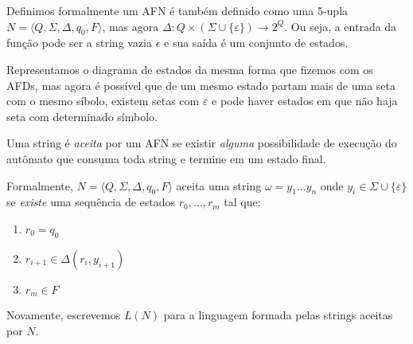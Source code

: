 Definimos formalmente um AFN é também definido como uma 5-upla $N = \langle Q, \Sigma, \Delta, q_0, F \rangle$, mas agora $\Delta: Q \times (\Sigma \cup \{\varepsilon\}) \to 2^Q$.
Ou seja, a entrada da função pode ser a string vazia $\epsilon$ e sua saída é um conjunto de estados.

Representamos o diagrama de estados da mesma forma que fizemos com os AFDs, mas agora é possível que de um mesmo estado partam mais de uma seta com o mesmo síbolo, existem setas com $\varepsilon$ e pode haver estados em que não haja seta com determinado símbolo.

Uma string é {\em aceita} por um AFN se existir {\em alguma} possibilidade de execução do autômato que consuma toda string e termine em um estado final.

Formalmente, $N = \langle Q, \Sigma, \Delta, q_0, F \rangle$ aceita uma string $\omega = y_1 \dots y_n$ onde $y_i \in \Sigma \cup \{\varepsilon\}$ se {\em existe} uma sequência de estados $r_0, \dots, r_m$ tal que:
\begin{enumerate}
\item $r_0 = q_0$
\item $r_{i+1} \in \Delta(r_i, y_{i+1})$
\item $r_m \in F$
\end{enumerate}

Novamente, escrevemos $L(N)$ para a linguagem formada pelas strings aceitas por $N$.


